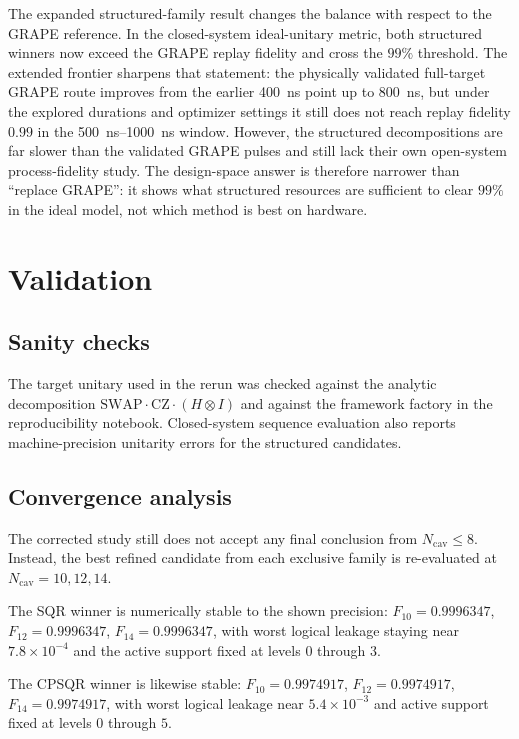 ﻿\documentclass[aps,pra,twocolumn,reprint,amsmath,amssymb,floatfix]{revtex4-2}
\begin{document}
The expanded structured-family result changes the balance with respect to the
GRAPE reference. In the closed-system ideal-unitary metric, both structured
winners now exceed the GRAPE replay fidelity and cross the $99\%$ threshold.
The extended frontier sharpens that statement: the physically validated
full-target GRAPE route improves from the earlier \SI{400}{ns} point up to
\SI{800}{ns}, but under the explored durations and optimizer settings it still
does not reach replay fidelity $0.99$ in the \SIrange{500}{1000}{ns} window.
However, the structured decompositions are far slower than the validated GRAPE
pulses and still lack their own open-system process-fidelity study. The
design-space answer is therefore narrower than ``replace GRAPE'': it shows what
structured resources are sufficient to clear $99\%$ in the ideal model, not
which method is best on hardware.

\section{Validation}

\subsection{Sanity checks}

The target unitary used in the rerun was checked against the analytic
decomposition $\mathrm{SWAP}\cdot\mathrm{CZ}\cdot(H\otimes I)$ and against the
framework factory in the reproducibility notebook. Closed-system sequence
evaluation also reports machine-precision unitarity errors for the structured
candidates.

\subsection{Convergence analysis}

The corrected study still does not accept any final conclusion from
$N_{\mathrm{cav}}\leq 8$. Instead, the best refined candidate from each
exclusive family is re-evaluated at $N_{\mathrm{cav}}=10,12,14$.

The SQR winner is numerically stable to the shown precision:
$F_{10}=0.9996347$, $F_{12}=0.9996347$, $F_{14}=0.9996347$, with worst logical
leakage staying near $7.8\times10^{-4}$ and the active support fixed at levels
$0$ through $3$.

The CPSQR winner is likewise stable:
$F_{10}=0.9974917$, $F_{12}=0.9974917$, $F_{14}=0.9974917$, with worst logical
leakage near $5.4\times10^{-3}$ and active support fixed at levels $0$ through
$5$.
\end{document}
